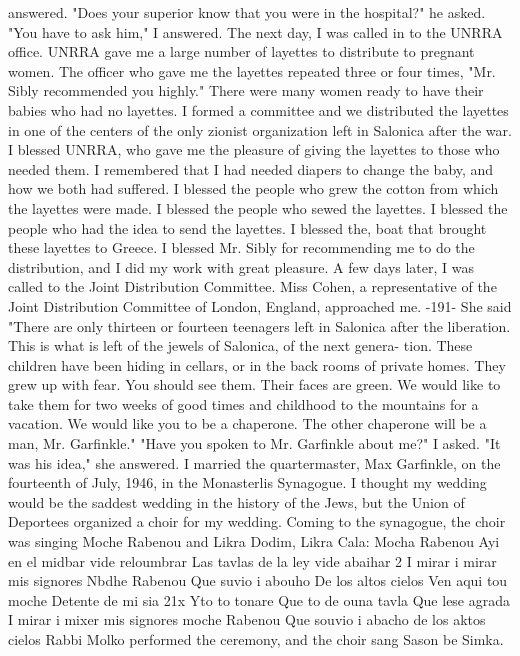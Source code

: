 answered.
"Does your superior know that you were in the hospital?"
he asked.
"You have to ask him," I answered.
The next day, I was called in to the UNRRA office.
UNRRA gave me a large number 
of layettes to distribute to pregnant women.
The officer who gave me the layettes repeated three or four times, "Mr.
Sibly recommended you highly."
There were many women ready to have their babies who had no layettes.
I formed 
a committee and we distributed the layettes in one of the centers of the only zionist organization  
left in Salonica after the war.
I blessed UNRRA, who gave me the pleasure of giving the layettes to those who needed them.
I remembered that I had needed 
diapers to change the baby, and how we both had suffered.
I blessed the people who 
grew the cotton from which the layettes were made.
I blessed the people who sewed the 
layettes.
I blessed the people who had the idea to send the layettes.
I blessed the, 
boat that brought these layettes to Greece.
I blessed Mr.
Sibly for recommending me 
to do the distribution, and I did my work with great pleasure.
A few days later, I was called to the Joint Distribution Committee.
Miss Cohen, 
a representative of the Joint Distribution Committee of London, England, approached me.
-191- 
She said "There are only thirteen or fourteen teenagers left in Salonica after 
the liberation.
This is what is left of the jewels of Salonica, of the next genera-
tion.
These children have been hiding in cellars, or in the back rooms of private 
homes.
They grew up with fear.
You should see them.
Their faces are green.
We 
would like to take them for two weeks of good times and childhood to the mountains 
for a vacation.
We would like you to be a chaperone.
The other chaperone will be a 
man, Mr.
Garfinkle."
"Have you spoken to Mr.
Garfinkle about me?"
I asked.
"It was his idea," she answered.
I married the quartermaster, Max Garfinkle, on the fourteenth of July, 1946, in 
the Monasterlis Synagogue.
I thought my wedding would be the saddest wedding in the 
history of the Jews, but the Union of Deportees organized a choir for my wedding.
Coming to the synagogue, the choir was singing Moche Rabenou and Likra Dodim, Likra Cala: 
Mocha Rabenou 
Ayi en el midbar vide reloumbrar 
Las tavlas de la ley vide abaihar 
2 
I mirar i mirar mis signores 
Nbdhe Rabenou 
Que suvio i abouho 
De los altos cielos 
Ven aqui tou moche 
Detente de mi sia 
21x Yto to tonare 
Que to de ouna tavla 
Que lese agrada 
I mirar i mixer mis signores 
moche Rabenou 
Que souvio i abacho de los aktos cielos 
Rabbi Molko performed the ceremony, and the choir sang Sason be Simka.
